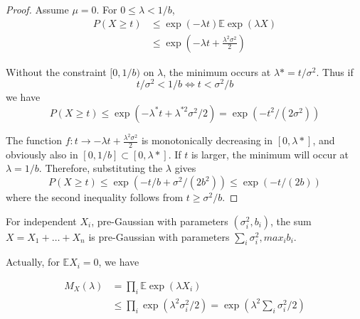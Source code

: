 \begin{proof}
  Assume $\mu = 0$. For $0 \leq \lambda < 1/b$,
  \begin{equation}
    \begin{aligned}
    P(X \geq t) & \leq \exp (-\lambda t) \mathbb{E} \exp (\lambda X) \\
    & \leq \exp \left(-\lambda t+\frac{\lambda^{2} \sigma^{2}}{2}\right)
    \end{aligned}
  \end{equation}
  
  Without the constraint $[0, 1/b)$ on $\lambda$, the minimum occurs at $\lambda* = t/ \sigma^2$.
  Thus if 
  \begin{equation}
    t / \sigma^{2}<1 / b \Longleftrightarrow t<\sigma^{2} / b
  \end{equation}
  we have
  \begin{equation}
    P(X \geq t) \leq \exp \left(-\lambda^{*} t+\lambda^{* 2} \sigma^{2} / 2\right)=\exp \left(-t^{2} /\left(2 \sigma^{2}\right)\right)
  \end{equation}

  The function $f: t \rightarrow -\lambda t + \frac{\lambda^2 \sigma^2}{2}$ is monotonically decreasing in $[0, \lambda*]$, and obviously also in $[0, 1/b] \subset [0, \lambda*]$.
  If $t$ is larger, the minimum will occur at $\lambda = 1/b$. 
  Therefore, substituting the $\lambda$ gives 
  \begin{equation}
    P(X \geq t) \leq \exp \left(-t / b+\sigma^{2} /\left(2 b^{2}\right)\right) \leq \exp (-t /(2 b))
  \end{equation}
  where the second inequality follows from $t \geq \sigma^2/b$.
\end{proof}

For independent $X_{i}$, pre-Gaussian with parameters $(\sigma_{i}^2, b_{i})$, the sum $X = X_1 + \dots + X_n$ is pre-Gaussian with parameters $\sum_{i} \sigma_{i}^2, max_{i} b_{i}$.

Actually, for $\mathbb{E}X_{i} = 0$, we have

\begin{equation}
  \begin{aligned}
  M_{X}(\lambda) &=\prod_{i} \mathbb{E} \exp \left(\lambda X_{i}\right) \\
  & \leq \prod_{i} \exp \left(\lambda^{2} \sigma_{i}^{2} / 2\right)=\exp \left(\lambda^{2} \sum_{i} \sigma_{i}^{2} / 2\right)
  \end{aligned}
\end{equation}

